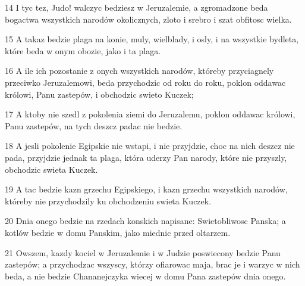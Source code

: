 \par 14 I tyc tez, Judo! walczyc bedziesz w Jeruzalemie, a zgromadzone beda bogactwa wszystkich narodów okolicznych, zloto i srebro i szat obfitosc wielka.
\par 15 A takaz bedzie plaga na konie, muly, wielblady, i osly, i na wszystkie bydleta, które beda w onym obozie, jako i ta plaga.
\par 16 A ile ich pozostanie z onych wszystkich narodów, któreby przyciagnely przeciwko Jeruzalemowi, beda przychodzic od roku do roku, poklon oddawac królowi, Panu zastepów, i obchodzic swieto Kuczek;
\par 17 A ktoby nie szedl z pokolenia ziemi do Jeruzalemu, poklon oddawac królowi, Panu zastepów, na tych deszcz padac nie bedzie.
\par 18 A jesli pokolenie Egipskie nie wstapi, i nie przyjdzie, choc na nich deszcz nie pada, przyjdzie jednak ta plaga, która uderzy Pan narody, które nie przyszly, obchodzic swieta Kuczek.
\par 19 A tac bedzie kazn grzechu Egipskiego, i kazn grzechu wszystkich narodów, któreby nie przychodzily ku obchodzeniu swieta Kuczek.
\par 20 Dnia onego bedzie na rzedach konskich napisane: Swietobliwosc Panska; a kotlów bedzie w domu Panskim, jako miednic przed oltarzem.
\par 21 Owszem, kazdy kociel w Jeruzalemie i w Judzie poswiecony bedzie Panu zastepów; a przychodzac wszyscy, którzy ofiarowac maja, brac je i warzyc w nich beda, a nie bedzie Chananejczyka wiecej w domu Pana zastepów dnia onego.


